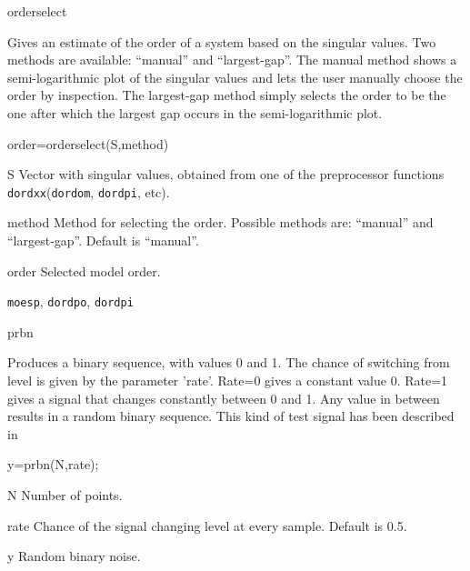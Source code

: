 \documentclass{book}
\newcommand{\moespf}{\texttt{moesp}}%
\newcommand{\dordxx}{\texttt{dordxx}}%
\newcommand{\dordom}{\texttt{dordom}}
\newcommand{\dordpo}{\texttt{dordpo}}
\newcommand{\dordpi}{\texttt{dordpi}}
\begin{document}
\begin{command}{orderselect}
\begin{purpose}
  Gives an estimate of the order of a system based on the singular
  values. Two methods are available: ``manual'' and ``largest-gap''.
  The manual method shows a semi-logarithmic plot of the singular
  values and lets the user manually choose the order by inspection.
  The largest-gap method simply selects the order to be the one after
  which the largest gap occurs in the semi-logarithmic plot.
\end{purpose}
\begin{syntax}
  order=orderselect(S,method)
\end{syntax}
\begin{inputs}
\item[S] Vector with singular values, obtained from one of the
  preprocessor functions {\dordxx}({\dordom}, {\dordpi}, etc).
\item[ method] Method for selecting the order.  Possible methods are:
  ``manual'' and ``largest-gap''.  Default is ``manual''.
\end{inputs}
\begin{outputs}
\item[order]  Selected model order.
\end{outputs}
\begin{seealso}
 {\moespf}, {\dordpo}, {\dordpi}
\end{seealso}
\end{command}%
 
\begin{command}{prbn}
\begin{purpose}
Produces a binary sequence, with values 0 and 1.  The chance
of switching from level is given by the parameter
'rate'. Rate=0 gives a constant value 0. Rate=1 gives
a signal that changes constantly between 0 and 1. Any
value in between results in a random binary sequence.
This kind of test signal has been described in \cite{Tulleken90}
\end{purpose}

\begin{syntax}
 y=prbn(N,rate);
\end{syntax}

\begin{inputs}
\item[N] Number of points.
\item[rate] Chance of the signal changing level at every sample.
  Default is 0.5.
\end{inputs}
         
\begin{outputs}
\item[y] Random binary noise.
\end{outputs}

\begin{seealso}
\mbox{}
\end{seealso}
\end{command}%
\end{document}
